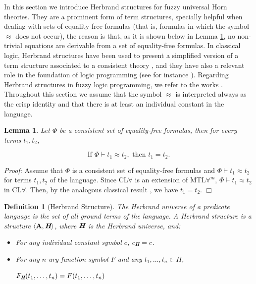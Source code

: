 \documentclass{IOS-Book-Article}
\newtheorem{lemma}{Lemma}
\newtheorem{defi}{Definition}
\newenvironment{proof}{ \noindent \textit{Proof:} }
{\hfill$\Box$\endtrivlist}
\begin{document}
In this section we introduce Herbrand structures for fuzzy universal Horn theories. They are a prominent form of term structures, specially helpful when dealing with sets of equality-free formulas (that is, formulas in which the symbol $\approx$ does not occur), the reason is that, as it is shown below in Lemma \ref{equality}, no non-trivial equations are derivable from a set of equality-free formulas. In classical logic, Herbrand structures have been used to present a simplified version of a term structure associated to a consistent theory \cite[Ch.11]{EbiFlu94}, and they have also a relevant role in the foundation of logic programming (see for instance \cite{DoPo10}). Regarding Herbrand structures in fuzzy logic programming, we refer to the works \cite{Ge05,Voj01,Ebra01}. Throughout this section we assume that the symbol $\approx$ is interpreted always as the crisp identity and that there is at least an individual constant in the language.

\begin{lemma} \label{equality} Let $\Phi$ be a consistent set of equality-free formulas, then for every terms $t_1,t_2$,

$$ \text{If }\Phi\vdash t_1\approx t_2, \text{ then }t_1=t_2.$$

\end{lemma}
\begin{proof}
Assume that $\Phi$ is a consistent set of equality-free formulas and $\Phi\vdash t_1\approx t_2$ for terms $t_1,t_2$ of the language. Since CL$\forall$ is an extension of MTL$\forall^m$, $\Phi\vdash t_1\approx t_2$ in CL$\forall$. Then, by the analogous classical result \cite[Ch. 11, Th. 3.1]{EbiFlu94}, we have $t_1=t_2$. \end{proof}


\begin{defi} [Herbrand Structure] \label{Herbrand structure}
The \emph{Herbrand universe of a predicate language} is the set of all ground terms of the language. A \emph{Herbrand structure} is a structure $\langle\textbf{A},\emph{\textbf{H}}\rangle$, where $\emph{\textbf{H}}$ is the Herbrand universe, and: \begin{itemize} 

\item[] For any individual constant symbol $c$, $c_{\emph{\textbf{H}}}=c$. 

\item[] For any $n$-ary function symbol $F$ and any $t_1,\ldots,t_n\in H$, \begin{center}

\smallskip

$F_{\emph{\textbf{H}}}(t_1,\ldots,t_n)=F(t_1,\ldots,t_n)$


\end{center}


\end{itemize} 

\end{defi}
\end{document}
